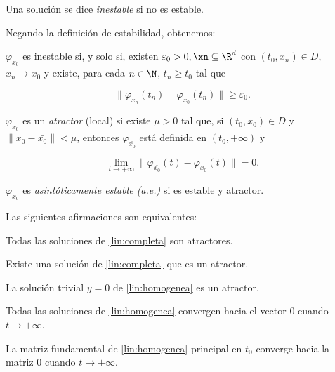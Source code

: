 \begin{ndef}
  Una solución se dice \emph{inestable} si no es estable.
\end{ndef}


Negando la definición de estabilidad, obtenemos:

\begin{nprop}
  $\varphi_{x_0}$ es inestable si, y solo si, existen $\varepsilon_0 > 0, \xn \subseteq\R^d$ con
  $(t_0,x_n)\in D$, $x_n \to x_0$ y existe, para cada $n\in\N$, $t_n \ge t_0$ tal que

  \[
    \| \varphi_{x_n}(t_n) - \varphi_{x_0}(t_n) \| \ge \varepsilon_0
  .\]
\end{nprop}

\begin{ndef}[Atractor]
  $\varphi_{x_0}$ es un \emph{atractor} (local) si existe $\mu > 0$ tal que, si $(t_0, \bar{x_0})\in D$
  y $\| x_0 - \bar{x_0} \| < \mu$, entonces $\varphi_{\bar{x_0}}$ está definida en $(t_0, +\infty)$ y

  \[
     \lim_{t\to+\infty} \| \varphi_{\bar{x_0}}(t) - \varphi_{x_0}(t) \| = 0.
  \]
\end{ndef}

\begin{ndef}
 $\varphi_{x_0}$ es \emph{asintóticamente estable (a.e.)} si es estable y atractor.
\end{ndef}



\begin{nprop}
Las siguientes afirmaciones son equivalentes:
\begin{nlist}
\item Todas las soluciones de \ref{lin:completa} son atractores.
\item Existe una solución de \ref{lin:completa} que es un atractor.
\item La solución trivial $y = 0$ de \ref{lin:homogenea} es un atractor.
\item Todas las soluciones de \ref{lin:homogenea} convergen hacia el vector 0 cuando $t \to +\infty$.
\item La matriz fundamental de \ref{lin:homogenea} principal en $t_0$ converge hacia la matriz 0 cuando $t \to +\infty$.
\end{nlist}
\end{nprop}

